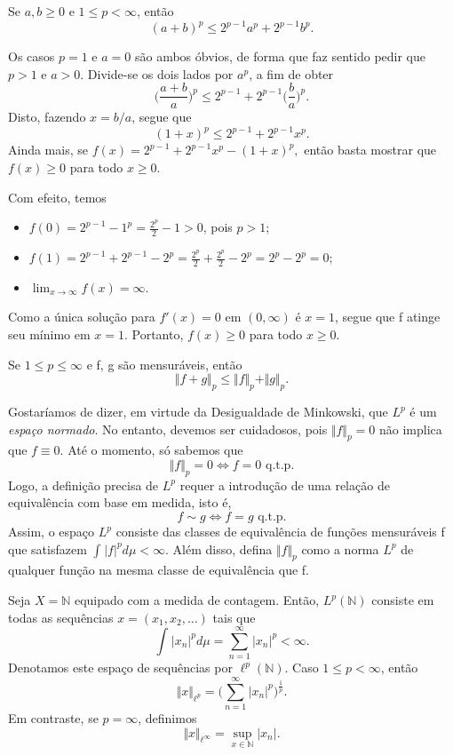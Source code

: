 \documentclass[MeasureTheory/measure_theory.tex]{subfiles}
\begin{document}
\begin{lemma*}
	Se \(a, b\geq 0\) e \(1\leq p < \infty\), então
	\[
		(a+b)^{p} \leq 2^{p-1}a^{p} + 2^{p-1}b^{p}.
	\]
\end{lemma*}
\begin{proof*}
	Os casos \(p=1\) e \(a=0\) são ambos óbvios, de forma que faz sentido pedir que \(p > 1\) e \(a > 0\). Divide-se os dois lados por \(a^{p}\), a fim de obter
	\[
		\biggl(\frac{a+b}{a}\biggr)^{p}\leq 2^{p-1} + 2^{p-1}\biggl(\frac{b}{a}\biggr)^{p}.
	\]
	Disto, fazendo \(x=b/a\), segue que
	\[
		(1+x)^{p}\leq 2^{p-1} + 2^{p-1}x^{p}.
	\]
	Ainda mais, se \(f(x) = 2^{p-1} + 2^{p-1}x^{p}-(1+x)^{p},\) então basta mostrar que \(f(x)\geq 0\) para todo \(x\geq 0\).

	Com efeito, temos
	\begin{itemize}
		\item \(f(0) = 2^{p-1}-1^{p} = \frac{2^{p}}{2}-1 > 0\), pois \(p>1\);
		\item \(f(1) = 2^{p-1} + 2^{p-1} - 2^{p} = \frac{2^{p}}{2} + \frac{2^{p}}{2} - 2^{p} = 2^{p}-2^{p} = 0\);
		\item \(\lim_{x\to \infty}f(x) = \infty\).
	\end{itemize}
	Como a única solução para \(f'(x) = 0\) em \((0, \infty)\) é \(x=1\), segue que f atinge seu mínimo em \(x=1\). Portanto, \(f(x)\geq 0\) para todo \(x\geq 0\).
\end{proof*}
\hypertarget{minkowski}{
	\begin{prop*}
		Se \(1\leq p\leq \infty\) e f, g são mensuráveis, então
		\[
			\Vert f + g \Vert_{p}\leq \Vert f \Vert_{p} + \Vert g \Vert_{p}.
		\]
	\end{prop*}
}
Gostaríamos de dizer, em virtude da Desigualdade de Minkowski, que \(L^{p}\) é um \textit{espaço normado}. No entanto, devemos ser cuidadosos, pois \(\Vert f \Vert_{p} = 0\) não implica que \(f\equiv 0\). Até o momento, só sabemos que
\[
	\Vert f \Vert_{p} = 0 \Longleftrightarrow f = 0 \text{ q.t.p.}
\]
Logo, a definição precisa de \(L^{p}\) requer a introdução de uma relação de equivalência com base em medida, isto é,
\[
	f\sim g \Longleftrightarrow f = g \text{ q.t.p.}
\]
Assim, o espaço \(L^{p}\) consiste das classes de equivalência de funções mensuráveis f que satisfazem \(\int_{}^{}|f|^{p}d\mu <\infty.\) Além disso, defina \(\Vert f \Vert_{p}\) como a norma \(L^{p}\) de qualquer função
na mesma classe de equivalência que f.
\begin{example}
	Seja \(X = \mathbb{N}\) equipado com a medida de contagem. Então, \(L^{p}(\mathbb{N})\) consiste em todas as sequências \(x=(x_1, x_2, \dotsc )\) tais que
	\[
		\int_{}^{}|x_{n}|^{p}d\mu = \sum\limits_{n=1}^{\infty}|x_{n}|^{p}<\infty.
	\]
	Denotamos este espaço de sequências por \(\ell ^{p}(\mathbb{N})\). Caso \(1\leq p < \infty\), então
	\[
		\Vert x \Vert_{\ell ^{p}} = \biggl(\sum\limits_{n=1}^{\infty}|x_{n}|^{p}\biggr)^{\frac{1}{p}}.
	\]
	Em contraste, se \(p = \infty\), definimos
	\[
		\Vert x \Vert_{\ell ^{\infty}} = \sup_{x\in \mathbb{N}}|x_{n}|.
	\]
\end{example}
\end{document}
